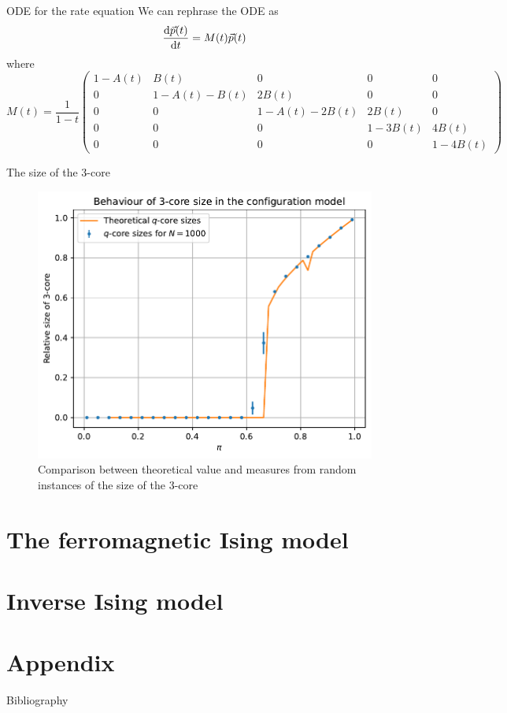\documentclass[handout]{beamer}
\begin{document}
\begin{frame}{ODE for the rate equation}
    We can rephrase the ODE as
    \begin{equation}
        \dv{\vec p(t)}{t} = M(t) \vec p(t)
    \end{equation}
    where
    {\scriptsize
    $$
    M(t) = \frac{1}{1-t}
    \begin{pmatrix}
        1-A(t) & B(t) & 0 & 0 & 0\\
        0 & 1-A(t)-B(t) & 2B(t) & 0 & 0\\
        0 & 0 & 1-A(t)-2B(t) & 2B(t) & 0\\
        0 & 0 & 0 & 1-3B(t) & 4B(t)\\
        0 & 0 & 0 & 0 & 1-4B(t)
    \end{pmatrix}
    $$
    }
\end{frame}

\begin{frame}{The size of the 3-core}
    \begin{figure}
        \centering
        \includegraphics[height=.7\textheight]{qcore}
        \caption{Comparison between theoretical value and measures from random
        instances of the size of the 3-core}
        \label{fig:qcore}
    \end{figure}
\end{frame}

\section{The ferromagnetic Ising model}

\section{Inverse Ising model}

\section{Appendix}

\begin{frame}{Bibliography}
    \printbibliography
\end{frame}
\end{document}
